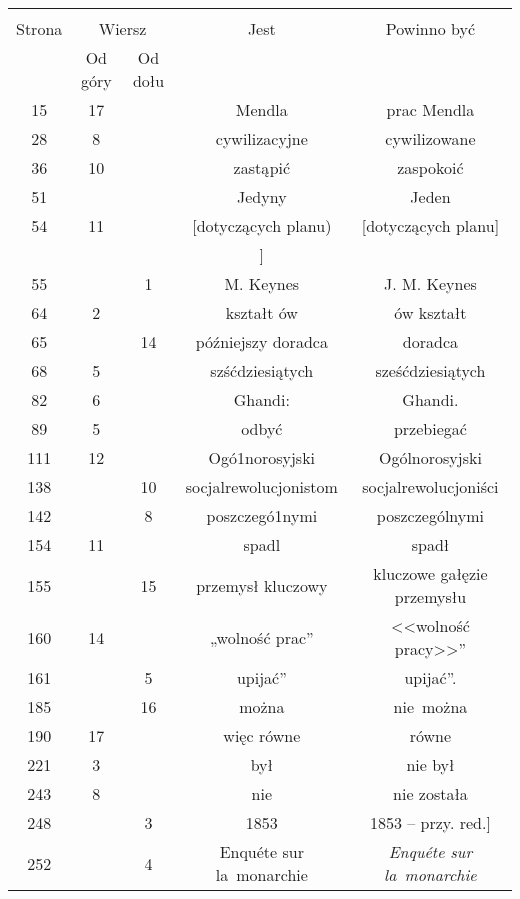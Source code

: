 \documentclass[a4paper,11pt]{article}
\begin{document}
\newpage
{}
\begin{center}

  \begin{tabular}{|c|c|c|c|c|}
    \hline
    & \multicolumn{2}{c|}{} & & \\
    Strona & \multicolumn{2}{c|}{Wiersz} & Jest
                              & Powinno być \\ \cline{2-3}
    & Od góry & Od dołu & & \\
    \hline
    15  & 17 & & Mendla & prac Mendla \\
    28  &  8 & & cywilizacyjne & cywilizowane \\
    36  & 10 & & zastąpić & zaspokoić \\
    51  & & & Jedyny & Jeden \\ %
    54  & 11 & & [dotyczących planu) & [dotyczących planu] \\
    & & & ] & \\
    55  & &  1 & M. Keynes & J. M. Keynes \\
    64  &  2 & & kształt ów & ów kształt \\
    65  & & 14 & późniejszy doradca & doradca \\
    68  &  5 & & szśćdziesiątych & sześćdziesiątych \\
    82  &  6 & & Ghandi: & Ghandi. \\
    89  &  5 & & odbyć & przebiegać \\
    111 & 12 & & Ogó1norosyjski & Ogólnorosyjski \\
    138 & & 10 & socjalrewolucjonistom & socjalrewolucjoniści \\
    142 & &  8 & poszczegó1nymi & poszczególnymi \\
    154 & 11 & & spadl & spadł \\
    155 & & 15 & przemysł kluczowy & kluczowe gałęzie przemysłu \\
    160 & 14 & & „wolność prac” & <<wolność pracy>>” \\
    161 & &  5 & upijać” & upijać”. \\
    185 & & 16 & można & nie~można \\
    190 & 17 & & więc równe & równe \\
    221 &  3 & & był & nie był \\
    243 &  8 & & nie & nie została \\
    248 & &  3 & 1853 & 1853 -- przy. red.] \\
    252 & &  4 & Enqu\'{e}te sur la~monarchie
           & \emph{Enqu\'{e}te sur la~monarchie} \\

\end{tabular}
\end{center}
\end{document}
